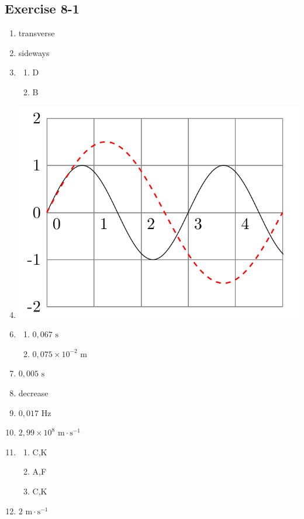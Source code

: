 \subsection{Exercise 8-1} 
\begin{multicols}{3}
\begin{enumerate}[label=\textbf{\arabic*}.]
\item %
transverse
\item %
sideways
\item %
\begin{enumerate}[noitemsep,label=\textbf{\alph*}.]
\item D
\item B
\end{enumerate}
\item %
\includegraphics[width=.3\textwidth]{photos/transverse_waves_wavelengths.png}
\end{enumerate}
\begin{enumerate}[label=\textbf{\arabic*}.]
\setcounter{enumi}{5}
\item %
\begin{enumerate}[noitemsep,label=\textbf{\alph*}.]
\item $0,067 \text{ s}$
\item $0,075 \times 10^{-2} \text{ m}$
\end{enumerate}
\item %
$0,005 \text{ s}$
\item %
decrease
\item %
$0,017 \text{ Hz}$
\item %
$2,99 \times 10^{8} \text{ m} \cdot \text{s}^{-1}$
\item %
\begin{enumerate}[noitemsep,label=\textbf{\alph*}.]
\item C,K
\item A,F
\item C,K
\end{enumerate}
\item %
$2 \text{ m} \cdot \text{s}^{-1}$
\end{enumerate}
\end{multicols}
